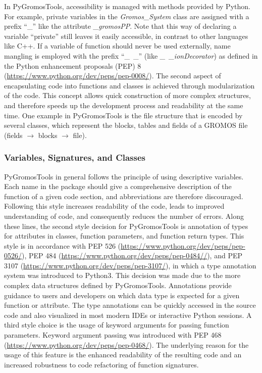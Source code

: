 In PyGromosTools, accessibility is managed with methods provided by Python. For example, private variables in the \textit{Gromos\_System} class are assigned with a prefix ``\_'' like the attribute \textit{\_gromosPP}. Note that this way of declaring a variable ``private'' still leaves it easily accessible, in contrast to other languages like C++. If a variable of function should never be used externally, name mangling is employed with the prefix ``\_~\_'' (like \textit{\_~\_ionDecorator}) as defined in the Python enhancement proposals (PEP) 8 (\url{https://www.python.org/dev/peps/pep-0008/}).
The second aspect of encapsulating code into functions and classes is achieved through modularization of the code. This concept allows quick construction of more complex structures, and therefore speeds up the development process and readability at the same time.\cite{Ganney2020}
One example in PyGromosTools is the file structure that is encoded by several classes, which represent the blocks, tables and fields of a GROMOS file (fields $\rightarrow$ blocks $\rightarrow$ file).

\subsubsection{Variables, Signatures, and Classes}
PyGromosTools in general follows the principle of using descriptive variables. Each name in the package should give a comprehensive description of the function of a given code section, and abbreviations are therefore discouraged. Following this style increases readability of the code, leads to improved understanding of code, and consequently reduces the number of errors. Along these lines, the second style decision for PyGromosTools is annotation of types for attributes in classes, function parameters, and function return types. This style is in accordance with PEP 526 (\url{https://www.python.org/dev/peps/pep-0526/}), PEP 484 (\url{https://www.python.org/dev/peps/pep-0484//}), and PEP 3107 (\url{https://www.python.org/dev/peps/pep-3107/}), in which a type annotation system was introduced to Python3. This decision was made due to the more complex data structures defined by PyGromosTools. Annotations provide guidance to users and developers on which data type is expected for a given function or attribute. The type annotations can be quickly accessed in the source code and also visualized in most modern IDEs or interactive Python sessions. A third style choice is the usage of keyword arguments for passing function parameters. Keyword argument passing was introduced with PEP 468 (\url{https://www.python.org/dev/peps/pep-0468/}). The underlying reason for the usage of this feature is the enhanced readability of the resulting code and an increased robustness to code refactoring of function signatures.

